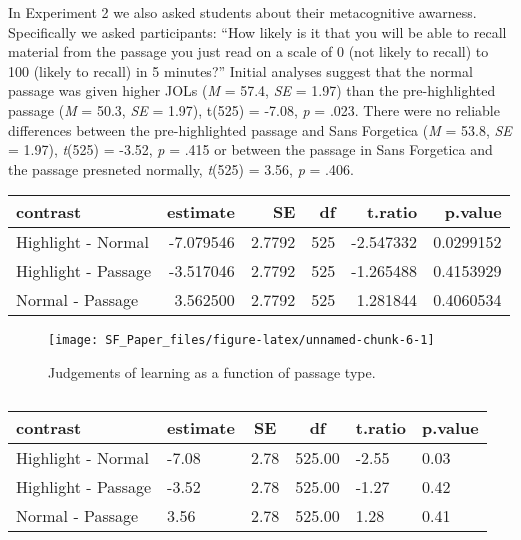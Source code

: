 \documentclass[doc]{apa6}
\begin{document}
In Experiment 2 we also asked students about their metacognitive awarness. Specifically we asked participants: \enquote{How likely is it that you will be able to recall material from the passage you just read on a scale of 0 (not likely to recall) to 100 (likely to recall) in 5 minutes?} Initial analyses suggest that the normal passage was given higher JOLs (\emph{M} = 57.4, \emph{SE} = 1.97) than the pre-highlighted passage (\emph{M} = 50.3, \emph{SE} = 1.97), t(525) = -7.08, \emph{p} = .023. There were no reliable differences between the pre-highlighted passage and Sans Forgetica (\emph{M} = 53.8, \emph{SE} = 1.97), \emph{t}(525) = -3.52, \emph{p} = .415 or between the passage in Sans Forgetica and the passage presneted normally, \emph{t}(525) = 3.56, \emph{p} = .406.

\begin{tabular}{l|r|r|r|r|r}
\hline
contrast & estimate & SE & df & t.ratio & p.value\\
\hline
Highlight - Normal & -7.079546 & 2.7792 & 525 & -2.547332 & 0.0299152\\
\hline
Highlight - Passage & -3.517046 & 2.7792 & 525 & -1.265488 & 0.4153929\\
\hline
Normal - Passage & 3.562500 & 2.7792 & 525 & 1.281844 & 0.4060534\\
\hline
\end{tabular}

\begin{figure}

{\centering \texttt{[image: SF\_Paper\_files/figure-latex/unnamed-chunk-6-1]} 

}

\caption{Judgements of learning as a function of passage type.}\label{fig:unnamed-chunk-6}
\end{figure}

\begin{table}[tbp]
\begin{center}
\begin{threeparttable}
\caption{\label{tab:unnamed-chunk-6}}
\begin{tabular}{llllll}
\toprule
contrast & \multicolumn{1}{c}{estimate} & \multicolumn{1}{c}{SE} & \multicolumn{1}{c}{df} & \multicolumn{1}{c}{t.ratio} & \multicolumn{1}{c}{p.value}\\
\midrule
Highlight - Normal & -7.08 & 2.78 & 525.00 & -2.55 & 0.03\\
Highlight - Passage & -3.52 & 2.78 & 525.00 & -1.27 & 0.42\\
Normal - Passage & 3.56 & 2.78 & 525.00 & 1.28 & 0.41\\
\bottomrule
\end{tabular}
\end{threeparttable}
\end{center}
\end{table}
\end{document}
